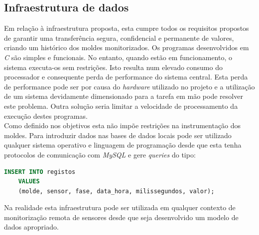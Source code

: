 \documentclass[11pt,twoside,a4paper]{report}
\begin{document}
\subsection{Infraestrutura de dados}
Em relação à infraestrutura proposta, esta cumpre todos os requisitos propostos de garantir uma transferência segura, confidencial e permanente de valores, criando um histórico dos moldes monitorizados. Os programas desenvolvidos em \textit{C} são simples e funcionais. No entanto, quando estão em funcionamento, o sistema executa-os sem restrições. Isto resulta num elevado consumo do processador e consequente perda de performance do sistema central. Esta perda de performance pode ser por causa do \textit{hardware} utilizado no projeto e a utilização de um sistema devidamente dimensionado para a tarefa em mão pode resolver este problema. Outra solução seria limitar a velocidade de processamento da execução destes programas.\\
Como definido nos objetivos esta não impõe restrições na instrumentação dos moldes. Para introduzir dados nas bases de dados locais pode ser utilizado qualquer sistema operativo e linguagem de programação desde que esta tenha protocolos de comunicação com \textit{MySQL} e gere \textit{queries} do tipo:
\begin{lstlisting}[language = SQL]
	INSERT INTO registos
	VALUES
	(molde, sensor, fase, data_hora, milissegundos, valor);
\end{lstlisting}
Na realidade esta infraestrutura pode ser utilizada em qualquer contexto de monitorização remota de sensores desde que seja desenvolvido um modelo de dados apropriado.
\end{document}
